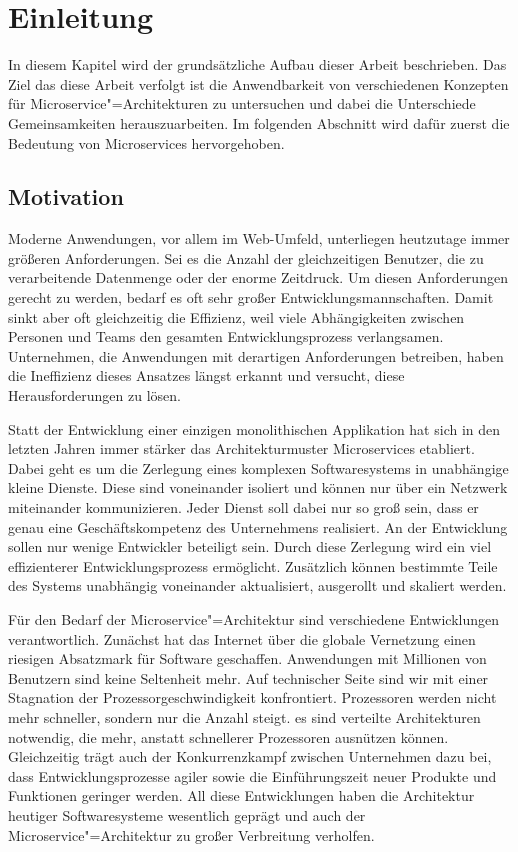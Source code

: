 \chapter{Einleitung}

In diesem Kapitel wird der grundsätzliche Aufbau dieser Arbeit beschrieben. Das Ziel das diese Arbeit verfolgt ist die Anwendbarkeit von verschiedenen Konzepten für Microservice"=Architekturen zu untersuchen und dabei die Unterschiede \bzw Gemeinsamkeiten herauszuarbeiten. Im folgenden Abschnitt wird dafür zuerst die Bedeutung von Microservices hervorgehoben.

\section{Motivation}

Moderne Anwendungen, vor allem im Web-Umfeld, unterliegen heutzutage immer größeren Anforderungen. Sei es die Anzahl der gleichzeitigen Benutzer, die zu verarbeitende Datenmenge oder der enorme Zeitdruck. Um diesen Anforderungen gerecht zu werden, bedarf es oft sehr großer Entwicklungsmannschaften. Damit sinkt aber oft gleichzeitig die Effizienz, weil viele Abhängigkeiten zwischen Personen und Teams den gesamten Entwicklungsprozess verlangsamen. Unternehmen, die Anwendungen mit derartigen Anforderungen betreiben, haben die Ineffizienz dieses Ansatzes längst erkannt und versucht, diese Herausforderungen zu lösen.

Statt der Entwicklung einer einzigen monolithischen Applikation hat sich in den letzten Jahren immer stärker das Architekturmuster Microservices etabliert. Dabei geht es um die Zerlegung eines komplexen Softwaresystems in unabhängige kleine Dienste. Diese sind voneinander isoliert und können nur über ein Netzwerk miteinander kommunizieren. Jeder Dienst soll dabei nur so groß sein, dass er genau eine Geschäftskompetenz des Unternehmens realisiert. An der Entwicklung sollen nur wenige Entwickler beteiligt sein. Durch diese Zerlegung wird ein viel effizienterer Entwicklungsprozess ermöglicht. Zusätzlich können bestimmte Teile des Systems unabhängig voneinander aktualisiert, ausgerollt und skaliert werden.

Für den Bedarf der Microservice"=Architektur sind verschiedene Entwicklungen verantwortlich. Zunächst hat das Internet über die globale Vernetzung einen riesigen Absatzmark für Software geschaffen. Anwendungen mit Millionen von Benutzern sind keine Seltenheit mehr. Auf technischer Seite sind wir mit einer Stagnation der Prozessorgeschwindigkeit konfrontiert. Prozessoren werden nicht mehr schneller, sondern nur die Anzahl steigt. \Dah es sind verteilte Architekturen notwendig, die mehr, anstatt schnellerer Prozessoren ausnützen können. Gleichzeitig trägt auch der Konkurrenzkampf zwischen Unternehmen dazu bei, dass Entwicklungsprozesse agiler sowie die Einführungszeit neuer Produkte und Funktionen geringer werden. All diese Entwicklungen haben die Architektur heutiger Softwaresysteme wesentlich geprägt und \zB auch der Microservice"=Architektur zu großer Verbreitung verholfen.


